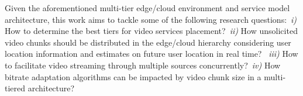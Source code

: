 Given the aforementioned multi-tier edge/cloud environment and service model architecture, this work aims to tackle some of the following research questions:~\textit{i)} How to determine the best tiers for video services placement?~\textit{ii)} How unsolicited video chunks should be distributed in the edge/cloud hierarchy considering user location information and estimates on future user location in real time? ~\textit{iii)} How to facilitate video streaming through multiple sources concurrently?~\textit{iv)} How bitrate adaptation algorithms can be impacted by video chunk size in a multi-tiered architecture?

